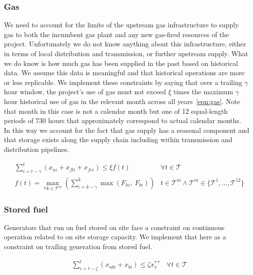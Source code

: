 \documentclass[9pt, oneside]{article}
\numberwithin{equation}{subsubsection}
\begin{document}
\subsubsection{Gas}\label{subsec:gas}
We need to account for the limits of the upstream gas infrastructure to supply gas to both the incumbent gas plant and any new gas-fired resources of the project.
Unfortunately we do not know anything about this infrastructure, either in terms of local distribution and transmission, or further upstream supply.
What we do know is how much gas has been supplied in the past based on historical data. We assume this data is meaningful and that historical operations are more or less replicable.
We implement these constraints by saying that over a trailing $\gamma$ hour window, the project's use of gas must not exceed $\xi$ times the maximum $\gamma$ hour historical use of gas in the relevant month across all years~\ref{eqn:gas}.
Note that month in this case is not a calendar month but one of 12 equal-length periods of 730 hours that approximately correspond to actual calendar months.
In this way we account for the fact that gas supply has a seasonal component and that storage exists along the supply chain including within transmission and distribution pipelines.

\begin{subequations}
	\begin{align}
		 & \sum_{i=t-\gamma}^{t} \left(x_{ni} + x_{fli} + x_{fei} \right) \leq \xi f(t)                                      & \forall t \in \mathcal{T}                                                               \\
		 & f(t) = \max_{ \forall k \in \mathcal{T}^m} \left(\sum_{i=k-\gamma}^{k} \max \left( F_{hi},\: F_{bi} \right) \right) & t \in \mathcal{T}^m \wedge \mathcal{T}^m \in \{ \mathcal{T}^1,\dots,\mathcal{T}^{12} \} \label{eqn:gas}
	\end{align}
\end{subequations}

\subsubsection{Stored fuel}\label{subsec:stored}
Generators that run on fuel stored on site face a constraint on continuous operation related to on site storage capacity.
We implement that here as a constraint on trailing generation from stored fuel.

\begin{subequations}
	\begin{align}
		 & \sum_{i=t-\zeta}^{t} \left( x_{nbi} + x_{bi} \right) \leq \zeta x_v^{**} & \forall t \in \mathcal{T}\label{eqn:stored}
	\end{align}
\end{subequations}
\end{document}
